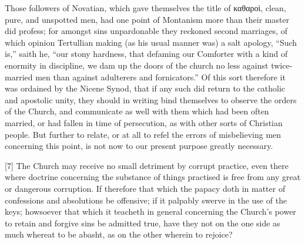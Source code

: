 Those followers of Novatian, which gave themselves the title of καθαροὶ, clean, pure, and unspotted men, had one point of Montanism more than their master did profess; for amongst sins unpardonable they reckoned second marriages, of which opinion Tertullian making (as his usual manner was) a salt apology, “Such is,” saith he, “our stony hardness, that defaming our Comforter with a kind of enormity in discipline, we dam up the doors of the church no less against twice-married men than against adulterers and fornicators.” Of this sort therefore it was ordained by the Nicene Synod, that if any such did return to the catholic and apostolic unity, they should in writing bind themselves to observe the orders of the Church, and communicate as well with them which had been often married, or had fallen in time of persecution, as with other sorts of Christian people. But further to relate, or at all to refel the errors of misbelieving men concerning this point, is not now to our present purpose greatly necessary.

[7] The Church may receive no small detriment by corrupt practice, even there where doctrine concerning the substance of things practised is free from any great or dangerous  corruption. If therefore that which the papacy doth in matter of confessions and absolutions be offensive; if it palpably swerve in the use of the keys; howsoever that which it teacheth in general concerning the Church’s power to retain and forgive sins be admitted true, have they not on the one side as much whereat to be abasht, as on the other wherein to rejoice?


